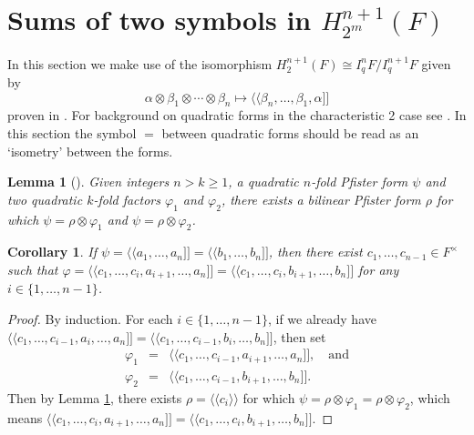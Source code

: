 \documentclass[preprint, 10pt, english]{elsarticle}
\newtheorem{cor}[thm]{Corollary}
\newtheorem{lem}[thm]{Lemma}
\theoremstyle{definition}
\renewcommand{\geq}{\geqslant}
\begin{document}
\section{Sums of two symbols in $H_{2^m}^{n+1}(F)$}

In this section we make use of the isomorphism $H_2^{n+1}(F) \cong I_q^n F/I_q^{n+1} F$ given by 
\[
\alpha\otimes \beta_1\otimes \cdots \otimes \beta_n \mapsto 
\langle \! \langle \beta_n,\dots, \beta_1,\alpha ] \! ] 
\]
proven in \cite{Kato:1982}. For background on quadratic forms in the characteristic 2 case see \cite{EKM}. In this section the symbol $=$ between quadratic forms should be read as an `isometry' between the forms.

\begin{lem}[{\cite[Lemma 3.1]{ChapmanLevin:2024}}]\label{chainstep}
Given integers $n > k \geq 1$, a quadratic $n$-fold Pfister form $\psi$ and two quadratic $k$-fold factors $\varphi_1$ and $\varphi_2$, there exists a bilinear Pfister form $\rho$ for which $\psi=\rho \otimes \varphi_1$ and $\psi=\rho \otimes \varphi_2$.
\end{lem}

\begin{cor}\label{Chain}
If $\psi=\langle \! \langle a_1,\dots,a_n ] \! ] = \langle \! \langle b_1,\dots,b_n ] \! ]$, then there exist $c_1,\dots,c_{n-1} \in F^\times$ such that
$\varphi=\langle \! \langle c_1,\dots,c_i,a_{i+1},\dots,a_n ] \! ]=\langle \! \langle c_1,\dots,c_i,b_{i+1},\dots,b_n ] \! ]$ for any $i \in \{1,\dots,n-1\}$.
\end{cor}

\begin{proof}
By induction. For each $i\in \{1,\dots,n-1\}$, if we already have $\langle \! \langle c_1,\dots,c_{i-1},a_i,\dots,a_n ] \! ]=\langle \! \langle c_1,\dots,c_{i-1},b_i,\dots,b_n ] \! ]$, then set 
\begin{eqnarray*}
\varphi_1&=&\langle \! \langle c_1,\dots,c_{i-1},a_{i+1},\dots,a_n ] \! ], \quad \text{and}\\ \varphi_2&=&\langle \! \langle c_1,\dots,c_{i-1},b_{i+1},\dots,b_n ] \! ].
\end{eqnarray*}
 Then by Lemma \ref{chainstep}, there exists $\rho=\langle \! \langle c_i \rangle \! \rangle$ for which $\psi=\rho \otimes \varphi_1=\rho \otimes \varphi_2$, which means 
$\langle \! \langle c_1,\dots,c_i,a_{i+1},\dots,a_n ] \! ]=\langle \! \langle c_1,\dots,c_i,b_{i+1},\dots,b_n ] \! ]$.
\end{proof}
\end{document}

